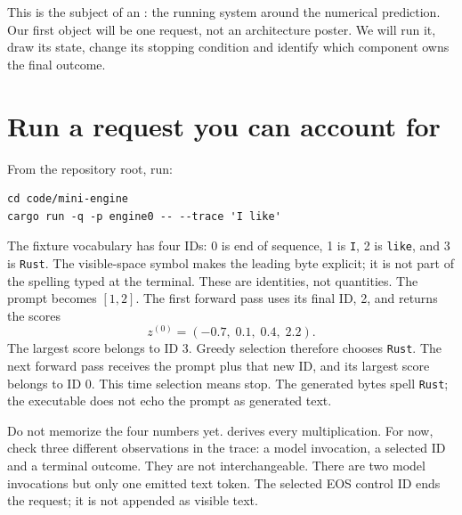 This is the subject of an : the running system around
the numerical prediction. Our first object will be one request, not an
architecture poster. We will run it, draw its state, change its stopping
condition and identify which component owns the final outcome.


\section{Run a request you can account for}
From the repository root, run:
\begin{verbatim}
cd code/mini-engine
cargo run -q -p engine0 -- --trace 'I like'
\end{verbatim}
The fixture vocabulary has four IDs: 0 is end of sequence, 1 is \texttt{I},
2 is \texttt{\textvisiblespace like}, and 3 is
\texttt{\textvisiblespace Rust}. The visible-space symbol makes the leading
byte explicit; it is not part of the spelling typed at the terminal.
These are identities, not quantities. The prompt becomes $[1,2]$.
The first forward pass uses its final ID, 2, and returns the scores
\begin{equation}
z^{(0)}=(-0.7,\;0.1,\;0.4,\;2.2).
\label{eq:first-logits}
\end{equation}
The largest score belongs to ID 3. Greedy selection therefore chooses
\texttt{Rust}. The next forward pass receives the prompt plus that new ID,
and its largest score belongs to ID 0. This time selection means stop.
The generated bytes spell \texttt{\textvisiblespace Rust}; the executable does not echo the
prompt as generated text.

Do not memorize the four numbers yet.  derives every multiplication.
For now, check three different observations in the trace: a model invocation,
a selected ID and a terminal outcome. They are not interchangeable.
There are two model invocations but only one emitted text token. The selected
EOS control ID ends the request; it is not appended as visible text.

